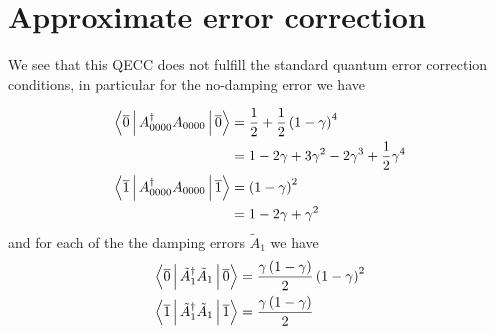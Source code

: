 \documentclass[twoside]{article}
\begin{document}
\section*{Approximate error correction}
We see that this QECC does not fulfill the standard quantum error correction conditions, in particular for the no-damping error we have

\begin{align}
\Braket{\overline{0}|A_{0000}^{\dag}A_{0000}|\overline{0}}  &= \frac{1}{2}+\frac{1}{2}\left(1-\gamma\right)^4\\
&= 1-2\gamma +3\gamma^2-2\gamma^3+\frac{1}{2}\gamma^4\\
\Braket{\overline{1}|A_{0000}^{\dag}A_{0000}|\overline{1}} &= \left(1-\gamma\right)^2\\
 & = 1-2\gamma+\gamma^2
\end{align}
and for each of the the damping errors $\tilde{A}_{1}$ we have
\begin{align}
\Braket{\overline{0}|\tilde{A}_{1}^{\dag}\tilde{A}_{1}|\overline{0}} &= \frac{\gamma\left(1-\gamma\right)}{2}\left(1-\gamma\right)^2\\
\Braket{\overline{1}|\tilde{A}_{1}^{\dag}\tilde{A}_{1}|\overline{1}} &= \frac{\gamma\left(1-\gamma\right)}{2}
\end{align}


%
\end{document}
